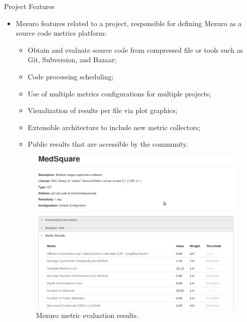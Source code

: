 \begin{block}{Project Features}
    \begin{itemize}
        \item Mezuro features related to a project, responsible for defining
            Mezuro as a source code metrics platform:
            \begin{itemize}
                \item Obtain and evaluate source code from compressed file or
                    tools such as Git, Subversion, and Bazaar;
                \item Code processing scheduling;
                \item Use of multiple metrics configurations for multiple
                    projects;
                \item Visualization of results per file via plot graphics;
                \item Extensible architecture to include new metric collectors;
                \item Public results that are accessible by the community.
            \end{itemize}
        \begin{figure}
            \begin{center}
                \includegraphics[scale=1]{figures/MezuroFeature1.png}
                \caption{Mezuro metric evaluation results.}
                \label{fig:feature1}
            \end{center}
        \end{figure}

    \end{itemize}
\end{block}

